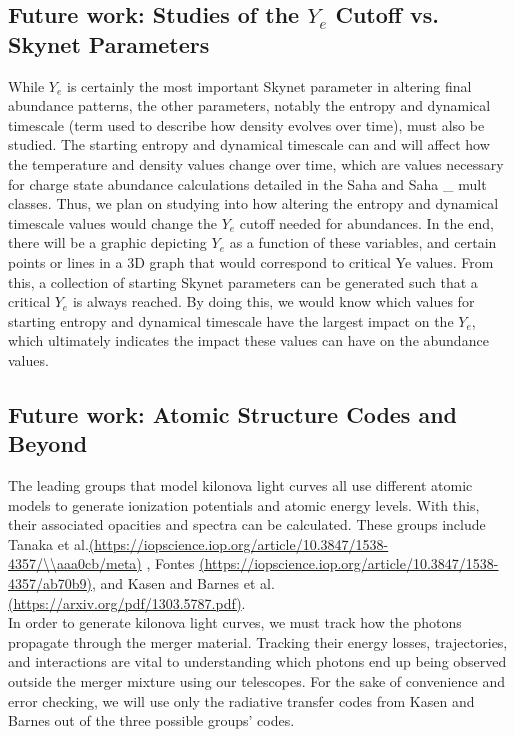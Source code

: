 \documentclass[11pt,a4paper]{article}
\begin{document}
\subsection{Future work: Studies of the $Y_e$ Cutoff vs. Skynet Parameters}

While $Y_e$ is certainly the most important Skynet parameter in altering final abundance patterns, the other parameters, notably the entropy and dynamical timescale (term used to describe how density evolves over time), must also be studied. The starting entropy and dynamical timescale can and will affect how the temperature and density values change over time, which are values necessary for charge state abundance calculations detailed in the Saha and Saha \_ mult classes. 
Thus, we plan on studying into how altering the entropy and dynamical timescale values would change the $Y_e$ cutoff needed for abundances. In the end, there will be a graphic depicting $Y_e$ as a function of these variables, and certain points or lines in a 3D graph that would correspond to critical Ye values. From this, a collection of starting Skynet parameters can be generated such that a critical $Y_e$ is always reached. By doing this, we would know which values for starting entropy and dynamical timescale have the largest impact on the $Y_e$, which ultimately indicates the impact these values can have on the abundance values. 


\subsection{Future work: Atomic Structure Codes and Beyond}

The leading groups that model kilonova light curves all use different atomic models to generate ionization potentials and atomic energy levels. With this, their associated opacities and spectra can be calculated.  These groups include Tanaka et al.\url{(https://iopscience.iop.org/article/10.3847/1538-4357/\\aaa0cb/meta)} , Fontes \url{(https://iopscience.iop.org/article/10.3847/1538-4357/ab70b9)}, and Kasen and Barnes et al. \url{(https://arxiv.org/pdf/1303.5787.pdf)}. \\

In order to generate kilonova light curves, we must track how the photons propagate through the merger material. Tracking their energy losses, trajectories, and interactions are vital to understanding which photons end up being observed outside the merger mixture using our telescopes. For the sake of convenience and error checking, we will use only the radiative transfer codes from Kasen and Barnes out of the three possible groups' codes.\\
\end{document}
